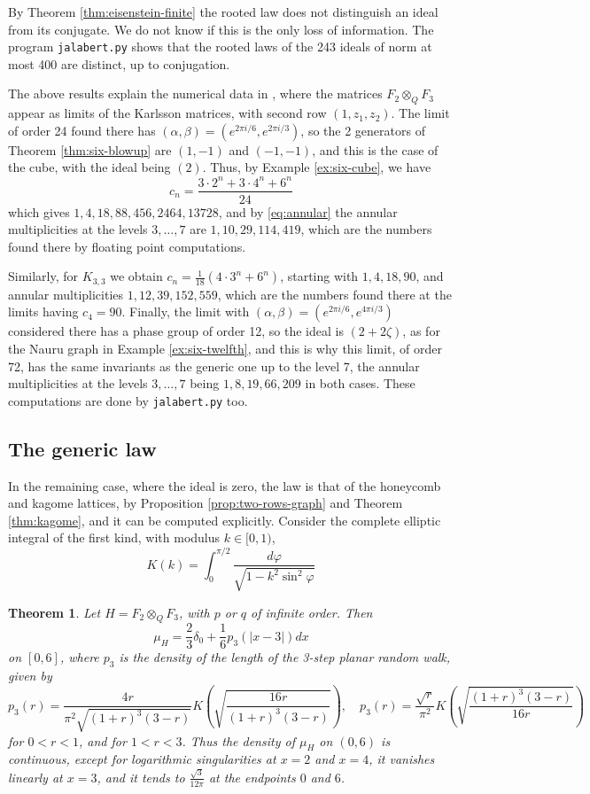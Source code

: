 \documentclass[11pt,reqno]{amsart}
\newtheorem{thm}{Theorem}[section]
\theoremstyle{definition}
\numberwithin{equation}{section}
\begin{document}
By Theorem \ref{thm:eisenstein-finite} the rooted law does not distinguish an ideal from its conjugate. We do not know if this is the only loss of information. The program \texttt{jalabert.py} shows that the rooted laws of the 243 ideals of norm at most 400 are distinct, up to conjugation.

The above results explain the numerical data in \cite{ABF26}, where the matrices $F_2\otimes_QF_3$ appear as limits of the Karlsson matrices, with second row $(1,z_1,z_2)$. The limit of order 24 found there has $(\alpha,\beta)=(e^{2\pi i/6},e^{2\pi i/3})$, so the 2 generators of Theorem \ref{thm:six-blowup} are $(1,-1)$ and $(-1,-1)$, and this is the case of the cube, with the ideal being $(2)$. Thus, by Example \ref{ex:six-cube}, we have
$$c_n=\frac{3\cdot2^n+3\cdot4^n+6^n}{24}$$
which gives $1,4,18,88,456,2464,13728$, and by \eqref{eq:annular} the annular multiplicities at the levels $3,\ldots,7$ are $1,10,29,114,419$, which are the numbers found there by floating point computations.

Similarly, for $K_{3,3}$ we obtain $c_n=\frac1{18}(4\cdot3^n+6^n)$, starting with $1,4,18,90$, and annular multiplicities $1,12,39,152,559$, which are the numbers found there at the limits having $c_4=90$. Finally, the limit with $(\alpha,\beta)=(e^{2\pi i/6},e^{4\pi i/3})$ considered there has a phase group of order 12, so the ideal is $(2+2\zeta)$, as for the Nauru graph in Example \ref{ex:six-twelfth}, and this is why this limit, of order 72, has the same invariants as the generic one up to the level 7, the annular multiplicities at the levels $3,\ldots,7$ being $1,8,19,66,209$ in both cases. These computations are done by \texttt{jalabert.py} too.

\subsection{The generic law}

In the remaining case, where the ideal is zero, the law is that of the honeycomb and kagome lattices, by Proposition \ref{prop:two-rows-graph} and Theorem \ref{thm:kagome}, and it can be computed explicitly. Consider the complete elliptic integral of the first kind, with modulus $k\in[0,1)$,
$$K(k)=\int_0^{\pi/2}\frac{d\varphi}{\sqrt{1-k^2\sin^2\varphi}}$$

\begin{thm}\label{thm:density}
Let $H=F_2\otimes_QF_3$, with $p$ or $q$ of infinite order. Then
$$\mu_H=\frac23\delta_0+\frac16p_3(|x-3|)dx$$
on $[0,6]$, where $p_3$ is the density of the length of the 3-step planar random walk, given by
$$p_3(r)=\frac{4r}{\pi^2\sqrt{(1+r)^3(3-r)}}K\left(\sqrt{\frac{16r}{(1+r)^3(3-r)}}\right),\quad
p_3(r)=\frac{\sqrt r}{\pi^2}K\left(\sqrt{\frac{(1+r)^3(3-r)}{16r}}\right)$$
for $0<r<1$, and for $1<r<3$. Thus the density of $\mu_H$ on $(0,6)$ is continuous, except for logarithmic singularities at $x=2$ and $x=4$, it vanishes linearly at $x=3$, and it tends to $\frac{\sqrt3}{12\pi}$ at the endpoints $0$ and $6$.
\end{thm}
\end{document}
